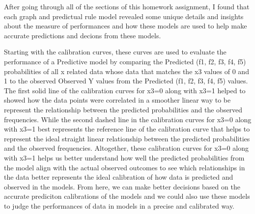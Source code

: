 \documentclass[
  letterpaper,
  DIV=11,
  numbers=noendperiod]{scrreprt}
\begin{document}
After going through all of the sections of this homework assignment, I
found that each graph and predictual rule model revealed some unique
details and insights about the measure of performances and how these
models are used to help make accurate predictions and decions from these
models.

Starting with the calibration curves, these curves are used to evaluate
the performance of a Predictive model by comparing the Predicted (f1,
f2, f3, f4, f5) probabilities of all x related data whose data that
matches the x3 values of 0 and 1 to the observed Observed Y values from
the Predicted (f1, f2, f3, f4, f5) values. The first solid line of the
calibration curves for x3=0 along with x3=1 helped to showed how the
data points were correlated in a smoother linear way to be represent the
relationship between the predicted probabilities and the observed
frequencies. While the second dashed line in the calibration curves for
x3=0 along with x3=1 best represents the reference line of the
calibration curve that helps to represent the ideal straight linear
relationship between the predicted probabilities and the observed
frequencies. Altogether, these calibration curves for x3=0 along with
x3=1 helps us better understand how well the predicted probabilities
from the model align with the actual observed outcomes to see which
relationships in the data better represents the ideal calibration of how
data is predicted and observed in the models. From here, we can make
better decisions based on the accurate prediciton calibrations of the
models and we could also use these models to judge the performances of
data in models in a precise and calibrated way.
\end{document}

